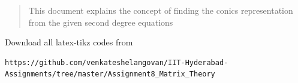 \documentclass[journal,12pt,twocolumn]{IEEEtran}
\begin{document}
% 
\maketitle
\newpage
\bigskip
\renewcommand{\thefigure}{\theenumi}
\renewcommand{\thetable}{\theenumi}
%
%
\begin{abstract}
This document explains the concept of finding the conics representation from the given second degree equations 
\end{abstract}
Download all latex-tikz codes from 
%
\begin{lstlisting}
https://github.com/venkateshelangovan/IIT-Hyderabad-Assignments/tree/master/Assignment8_Matrix_Theory
\end{lstlisting}
%
\end{document}
